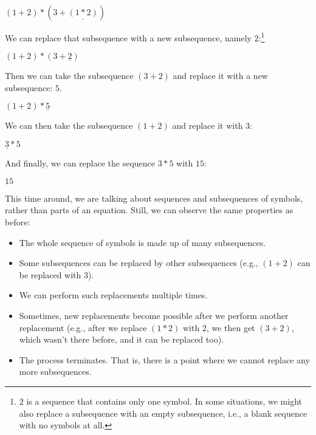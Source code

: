 \documentclass{book}
\numberwithin{equation}{chapter}
\begin{document}
\begin{center}
$(1 + 2) * (3 + \underline{(1 *2)})$
\end{center}

\noindent
We can replace that subsequence with a new subsequence, namely $2$:\footnote{$2$ is a sequence that contains only one symbol. In some situations, we might also replace a subsequence with an empty subsequence, i.e., a blank sequence with no symbols at all.}

\begin{center}
$(1 + 2) * (3 + \underline{2})$
\end{center}

\noindent
Then we can take the subsequence $(3 + 2)$ and replace it with a new subsequence: $5$.

\begin{center}
$(1 + 2) * \underline{5}$
\end{center}

\noindent
We can then take the subsequence $(1 + 2)$ and replace it with $3$:

\begin{center}
$\underline{3} * 5$
\end{center}

\noindent
And finally, we can replace the sequence $3 * 5$ with $15$:

\begin{center}
$15$
\end{center}

\noindent
This time around, we are talking about sequences and subsequences of symbols, rather than parts of an equation. Still, we can observe the same properties as before:

\begin{itemize}
\item{The whole sequence of symbols is made up of many subsequences.}
\item{Some subsequences can be replaced by other subsequences (e.g., $(1 + 2)$ can be replaced with $3$).}
\item{We can perform such replacements multiple times.}
\item{Sometimes, new replacements become possible after we perform another replacement (e.g., after we replace $(1 * 2)$ with $2$, we then get $(3 + 2)$, which wasn't there before, and it can be replaced too).}
\item{The process terminates. That is, there is a point where we cannot replace any more subsequences.}
\end{itemize}
\end{document}
